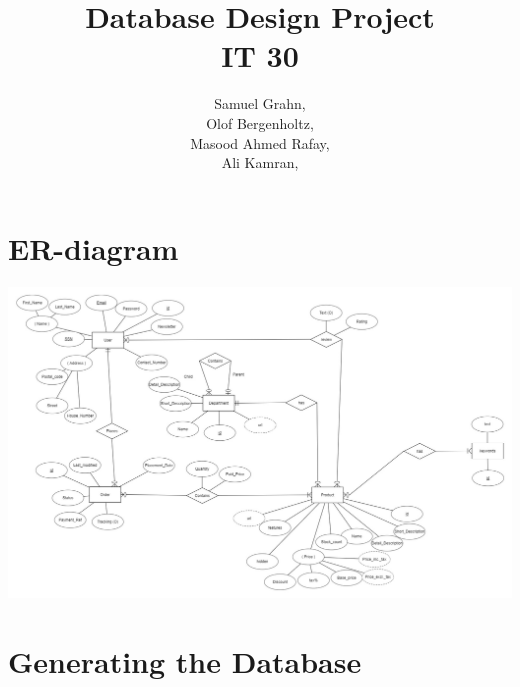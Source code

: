 \documentclass{article}
\title{
  Database Design Project\\
  IT 30
}
\author{
  Samuel Grahn, \email{samuel.grahn@outlook.com}\\
  Olof Bergenholtz, \email{obergenholtz@gmail.com}\\
  Masood Ahmed Rafay, \email{Rafayqureshi2010@gmail.com}\\
  Ali Kamran, \email{alkmrn1@gmail.com}\\
}
\newcommand{\sql}[1]{}
\begin{document}
\maketitle
\newpage
\section*{ER-diagram}
\includegraphics[height=\linewidth,angle=90]{er.png}

\section*{Generating the Database}
\sql{creation}
\end{document}
